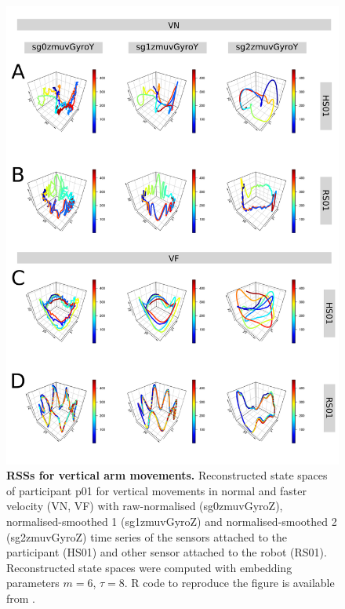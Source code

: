 \begin{figure}[!h]
\centering
\includegraphics[height=0.85\textheight]{rss_aV}
    \caption{
	{\bf RSSs for vertical arm movements.}
	Reconstructed state spaces %
	of participant p01 for vertical movements in normal and faster 
	velocity (VN, VF) with raw-normalised (sg0zmuvGyroZ), 
	normalised-smoothed 1 (sg1zmuvGyroZ) and 
	normalised-smoothed 2 (sg2zmuvGyroZ) time series of the 
	sensors attached to the participant (HS01) and other sensor 
	attached to the robot (RS01).	
	Reconstructed state spaces were computed with 
	embedding parameters $m=6$, $\tau=8$.
	R code to reproduce the figure is available from \cite{hwum2018}.
        }
    \label{fig:rss_aVw10}
\end{figure}


